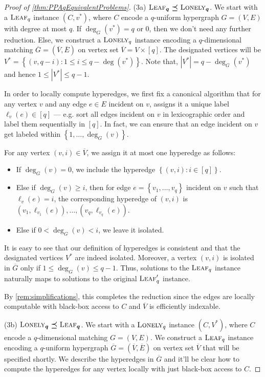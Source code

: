 \documentclass[10pt,a4paper]{article}
\theoremstyle{definition}
\theoremstyle{remark}
\newcommand{\contour}[2]{#2}
\def\set#1{\left\{#1\right\}}
\newcommand{\parasc}[1]{\noindent \contour{black}{#1}}
\newcommand{\leaf}{\ensuremath\textsc{Leaf}}
\newcommand{\lonely}{\ensuremath\textsc{Lonely}}
\newcommand{\reducible}{\preceq}
\begin{document}
\begin{proof}[Proof of \autoref{thm:PPAqEquivalentProblems}]
\medskip

\parasc{(3a) $\boldsymbol{\leaf_q \reducible \lonely_q}$.} We start with a $\leaf_q$ instance $(C, v^*)$, where $C$ encode a $q$-uniform hypergraph $G = (V, E)$ with degree at most $q$. If $\deg_G(v^*) = q$ or $0$, then we don't need any further reduction. Else, we construct a $\lonely_q$ instance encoding a $q$-dimensional matching $\overline{G} = (\overline{V}, \overline{E})$ on vertex set $\overline{V} = V \times [q]$. The designated vertices will be $V^* = \set{(v,q-i) : 1 \le i \le q - \deg(v^*)}$. Note that, $|V^*| = q - \deg_G(v^*)$ and hence $1 \le |V^*| \le q-1$.

In order to locally compute hyperedges, we first fix a canonical algorithm that for any vertex $v$ and any edge $e \in E$ incident on $v$, assigns it a unique label $\ell_v(e) \in [q]$ --- e.g. sort all edges incident on $v$ in lexicographic order and label them sequentially in $[q]$. In fact, we can ensure that an edge incident on $v$ get labeled within $\set{1, \ldots, \deg_G(v)}$.

For any vertex $(v, i) \in \overline{V}$, we assign it at most one hyperedge as follows:
\begin{itemize}[label=$\triangleright$]
\item If $\deg_G(v) = 0$, we include the hyperedge $\set{(v,i) : i \in [q]}$.
\item Else if $\deg_G(v) \ge i$, then for edge $e = \set{v_1, \ldots, v_q}$ incident on $v$ such that $\ell_v(e)=i$, the corresponding hyperedge of $(v,i)$ is ${(v_1, \ell_{v_1}(e)), \ldots, (v_q, \ell_{v_q}(e))}$.
\item Else if $0 < \deg_G(v) < i$, we leave it isolated.
\end{itemize}

It is easy to see that our definition of hyperedges is consistent and that the designated vertices $V^*$ are indeed isolated. Moreover, a vertex $(v,i)$ is isolated in $\overline{G}$ only if $1 \le \deg_G(v)\le q-1$. Thus, solutions to the $\leaf_q$ instance naturally maps to solutions to the original $\leaf_q'$ instance.

By \autoref{rem:simplifications}, this completes the reduction since the edges are locally computable with black-box access to $C$ and $\overline{V}$ is efficiently indexable.

\medskip

\parasc{(3b) $\boldsymbol{\lonely_q \reducible \leaf_q}$.} We start with a $\lonely_q$ instance $(C, V^*)$, where $C$ encode a $q$-dimensional matching $G = (V, E)$. We construct a $\leaf_q$ instance encoding a $q$-uniform hypergraph $\overline{G} = (\overline{V}, \overline{E})$ on vertex set $\overline{V}$ that will be specified shortly. We describe the hyperedges in $\overline{G}$ and it'll be clear how to compute the hyperedges for any vertex locally with just black-box access to $C$.


\end{proof}
\end{document}
